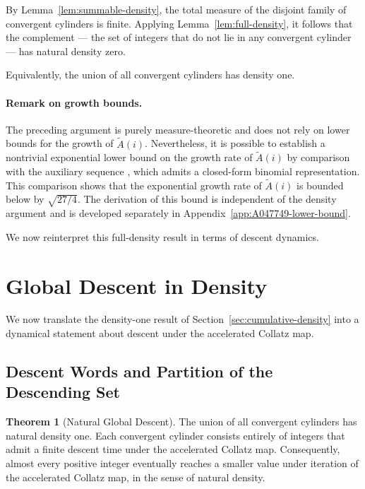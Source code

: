 \documentclass[12pt, oneside]{article}   	%
\numberwithin{equation}{section}          %
\theoremstyle{definition}
\newtheorem{theorem}{Theorem}
\begin{document}
By Lemma~\ref{lem:summable-density}, the total measure of the disjoint
family of convergent cylinders is finite. Applying
Lemma~\ref{lem:full-density}, it follows that the complement
— the set of integers that do not lie in any convergent cylinder —
has natural density zero.

Equivalently, the union of all convergent cylinders has density one.

\paragraph{Remark on growth bounds.}
The preceding argument is purely measure-theoretic and does not rely on lower
bounds for the growth of \(\widetilde A(i)\). Nevertheless, it is possible to
establish a nontrivial exponential lower bound on the growth rate of
\(\widetilde A(i)\) by comparison with the auxiliary sequence ,
which admits a closed-form binomial representation. This comparison shows that
the exponential growth rate of \(\widetilde A(i)\) is bounded below by
\(\sqrt{27/4}\). The derivation of this bound is independent of the density
argument and is developed separately in Appendix~\ref{app:A047749-lower-bound}.

We now reinterpret this full-density result in terms of descent dynamics.


\newpage
\section{Global Descent in Density}
\label{sec:global-descent}

We now translate the density-one result of Section~\ref{sec:cumulative-density}
into a dynamical statement about descent under the accelerated Collatz map.

\subsection{Descent Words and Partition of the Descending Set}

\begin{theorem}[Natural Global Descent]
\label{thm:natural-descent}
The union of all convergent cylinders has natural density one. Each convergent
cylinder consists entirely of integers that admit a finite descent time under
the accelerated Collatz map. Consequently, almost every positive integer
eventually reaches a smaller value under iteration of the accelerated Collatz
map, in the sense of natural density.
\end{theorem}
\end{document}
